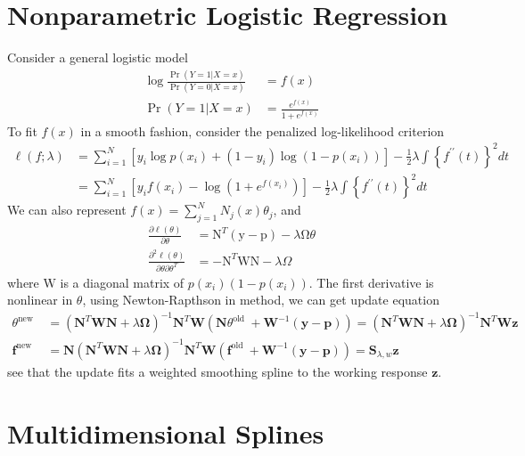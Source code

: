 \section{Nonparametric Logistic Regression}
Consider a general logistic model
\begin{align*}
    \log \frac{\operatorname{Pr}(Y=1 | X=x)}{\operatorname{Pr}(Y=0 | X=x)}&=f(x)\\
    \operatorname{Pr}(Y=1 | X=x)&=\frac{e^{f(x)}}{1+e^{f(x)}}
\end{align*}
To fit $f(x)$ in a smooth fashion, consider the penalized log-likelihood criterion
\begin{align*}
\ell(f ; \lambda) 
&=\sum_{i=1}^{N}\left[y_{i}\log p\left(x_{i}\right)+\left(1-y_{i}\right)\log\left(1-p\left(x_{i}\right)\right)\right]-\frac{1}{2} \lambda \int\left\{f^{\prime \prime}(t)\right\}^{2}dt\\
&=\sum_{i=1}^{N}\left[y_{i} f\left(x_{i}\right)-\log \left(1+e^{f\left(x_{i}\right)}\right)\right]-\frac{1}{2} \lambda \int\left\{f^{\prime \prime}(t)\right\}^{2} dt
\end{align*}
We can also represent $f(x)=\sum_{j=1}^{N} N_{j}(x) \theta_{j}$, and
\begin{align*} 
\frac{\partial \ell(\theta)}{\partial \theta} 
&=\mathrm{N}^{T}(\mathrm{y}-\mathrm{p})-\lambda \mathrm{\Omega} \theta \\ 
\frac{\partial^{2} \ell(\theta)}{\partial \theta \partial \theta^{T}} 
&=-\mathrm{N}^{T} \mathrm{WN}-\lambda \Omega 
\end{align*}
where $\mathrm{W}$ is a diagonal matrix of $p(x_i)(1-p(x_i))$. 
The first derivative is nonlinear in $\theta$, using Newton-Rapthson in method, we can get
update equation
\begin{align*} 
\theta^{\text {new }}
&=\left(\mathbf{N}^{T}\mathbf{W N}+\lambda\mathbf{\Omega}\right)^{-1}\mathbf{N}^{T}
\mathbf{W}\left(\mathbf{N} \theta^{\text {old }}+\mathbf{W}^{-1}(\mathbf{y}-\mathbf{p})\right)
=\left(\mathbf{N}^{T}\mathbf{W}\mathbf{N}+\lambda\mathbf{\Omega}\right)^{-1}\mathbf{N}^{T}\mathbf{W}\mathbf{z} \\
\mathbf{f}^{\text {new }}&=\mathbf{N}\left(\mathbf{N}^{T} \mathbf{W} \mathbf{N}+\lambda \mathbf{\Omega}\right)^{-1} \mathbf{N}^{T} \mathbf{W}\left(\mathbf{f}^{\text {old }}+\mathbf{W}^{-1}(\mathbf{y}-\mathbf{p})\right)
=\mathbf{S}_{\lambda, w}\mathbf{z}
\end{align*}
see that the update fits a weighted smoothing spline to the working response $\mathbf{z}$. 

\section{Multidimensional Splines}